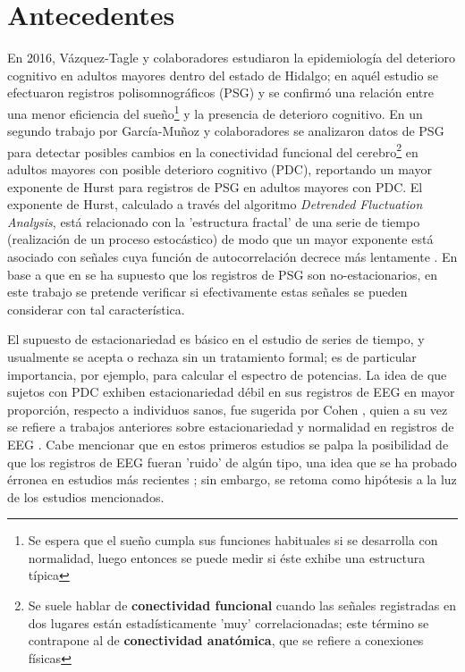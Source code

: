 \documentclass[12pt,a4paper]{mitthesis}
\begin{document}
\setcounter{page}{1}

\chapter{Antecedentes}

En 2016, V\'azquez-Tagle y colaboradores \cite{VazquezTagle16} estudiaron la epidemiolog\'ia del 
deterioro cognitivo en adultos mayores dentro del estado de Hidalgo; en aqu\'el estudio se 
efectuaron registros polisomnogr\'aficos (PSG) y se confirm\'o una relaci\'on entre una menor 
eficiencia del sue\~no\footnote{Se espera que el sue\~no cumpla sus funciones habituales si se 
desarrolla con normalidad, luego entonces se puede medir si \'este exhibe una estructura t\'ipica} 
y la presencia de deterioro cognitivo.
En un segundo trabajo por Garc\'ia-Mu\~noz y colaboradores \cite{Valeria} se analizaron datos de 
PSG para detectar posibles cambios en la conectividad funcional del cerebro\footnote{Se suele 
hablar de \textbf{conectividad funcional} cuando las se\~nales registradas en dos lugares est\'an 
estad\'isticamente 'muy' correlacionadas; este t\'ermino se contrapone al de \textbf{conectividad 
anat\'omica}, que se refiere a conexiones f\'isicas} en adultos mayores con posible deterioro 
cognitivo (PDC), reportando un mayor exponente de Hurst para registros de PSG en adultos mayores 
con PDC.
El exponente de Hurst, calculado a trav\'es del algoritmo \textit{Detrended Fluctuation Analysis}, 
est\'a relacionado con la 'estructura fractal' de una serie de tiempo (realizaci\'on de un proceso 
estoc\'astico) de modo que un mayor exponente est\'a asociado con se\~nales cuya funci\'on de 
autocorrelaci\'on decrece m\'as lentamente \cite{Rodriguez11}.
En base a que en \cite{Valeria} se ha supuesto que los registros de PSG son no-estacionarios, en 
este trabajo se pretende verificar si efectivamente estas se\~nales se pueden considerar con tal
caracter\'istica.

El supuesto de estacionariedad es b\'asico en el estudio de series de tiempo, y usualmente se 
acepta o rechaza sin un tratamiento formal; es de particular importancia, por ejemplo, para 
calcular el espectro de potencias.
La idea de que sujetos con PDC exhiben estacionariedad d\'ebil en sus registros de EEG en mayor 
proporci\'on, respecto a individuos sanos, fue sugerida por Cohen \cite{Cohen77}, quien a su vez se 
refiere a trabajos anteriores sobre estacionariedad y normalidad en registros de EEG 
\cite{McEwen75,Sugimoto78,Kawabata73}.
Cabe mencionar que en estos primeros estudios se palpa la posibilidad de que los registros de EEG 
fueran 'ruido' de alg\'un tipo, una idea que se ha probado \'erronea en estudios m\'as recientes 
\cite{Klonowski09}; sin embargo, se retoma como hip\'otesis a la luz de los estudios mencionados. 
\end{document}
